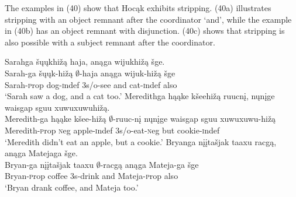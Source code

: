 \documentclass[output=paper]{LSP/langsci}
\begin{document}
\begin{exe}
\ex
{}
\end{exe}

The examples in (40) show that Hocąk exhibits stripping. (40a) illustrates stripping with an object remnant after the coordinator `and', while the example in (40b) has an object remnant with disjunction. (40c) shows that stripping is also possible with a subject remnant after the coordinator.

\begin{exe}
\ex
\begin{xlist}
\ex
\glll Sarahga šųųkhižą haja, anąga wijukhižą šge.\\
Sarah-ga šųųk-hižą $\emptyset$-haja anąga wijuk-hižą šge\\
Sarah-{\textsc prop} dog-{\textsc indef} {\textsc 3s/o}-see and cat-{\textsc indef} also\\
\trans `Sarah saw a dog, and a cat too.'
 \ex
\glll Meredithga hąąke kšeehižą ruucnį, nųnįge {waisgap sguu xuwuxuwuhižą}.\\
Meredith-ga hąąke kšee-hižą $\emptyset$-ruuc-nį nųnįge {waisgap sguu xuwuxuwu-hižą}\\
Meredith-{\textsc prop} {\textsc neg} apple-{\textsc indef} {\textsc 3s/o}-eat-{\textsc neg} but cookie-{\textsc indef}\\
\trans `Meredith didn't eat an apple, but a cookie.'
 \ex
\glll Bryanga {nįįtašjak taaxu} racgą, anąga Matejaga šge.\\
Bryan-ga {nįįtašjak taaxu} $\emptyset$-racgą anąga Mateja-ga šge\\
Bryan-{\textsc prop} coffee {\textsc 3s}-drink and Mateja-{\textsc prop} also\\
\trans `Bryan drank coffee, and Mateja too.'
\end{xlist}
\end{exe}
\end{document}
